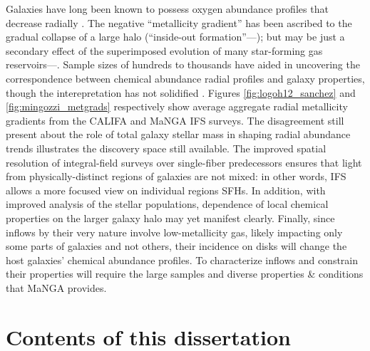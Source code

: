 Galaxies have long been known to possess oxygen abundance profiles that decrease radially \citep{oey_kennicutt_1993, zaritsky_1994, sanchez_2014_metgrad, belfiore_2017_manga-metgrad, poetrodjojo_18, sanchez_19_review}. The negative ``metallicity gradient'' has been ascribed to the gradual collapse of a large halo (``inside-out formation''---\citealt{prantzos_boissier_2000_metgrad}); but may be just a secondary effect of the superimposed evolution of many star-forming gas reservoirs---\citealt{moran_2012}. Sample sizes of hundreds to thousands have aided in uncovering the correspondence between chemical abundance radial profiles and galaxy properties, though the interepretation has not solidified \citep{sanchez_2014_metgrad, belfiore_2017_manga-metgrad, poetrodjojo_18, mingozzi_2020}. Figures \ref{fig:logoh12_sanchez} and \ref{fig:mingozzi_metgrads} respectively show average aggregate radial metallicity gradients from the CALIFA and MaNGA IFS surveys. The disagreement still present about the role of total galaxy stellar mass in shaping radial abundance trends illustrates the discovery space still available. The improved spatial resolution of integral-field surveys over single-fiber predecessors ensures that light from physically-distinct regions of galaxies are not mixed: in other words, IFS allows a more focused view on individual regions SFHs. In addition, with improved analysis of the stellar populations, dependence of local chemical properties on the larger galaxy halo may yet manifest clearly. Finally, since inflows by their very nature involve low-metallicity gas, likely impacting only some parts of galaxies and not others, their incidence on disks will change the host galaxies' chemical abundance profiles. To characterize inflows and constrain their properties will require the large samples and diverse properties \& conditions that MaNGA provides.

\section{Contents of this dissertation}

